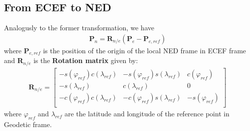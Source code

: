 \subsection*{From ECEF to NED}
Analogusly to the former transformation, we have
\begin{align}
\textbf{P}_{n} = \textbf{R}_{n/e}\left(\textbf{P}_{e} - \textbf{P}_{e,ref}\right)
\end{align}
where \textbf{P}$_{e,ref}$ is the position of the origin of the local NED frame in ECEF frame and \textbf{R}$_{n/e}$ is the \textbf{Rotation matrix} given by: 
\begin{align*}
\textbf{R}_{n/e} =
\begin{bmatrix}
-s(\varphi_{ref})c(\lambda_{ref}) & -s(\varphi_{ref})s(\lambda_{ref}) & c(\varphi_{ref})\\
-s(\lambda_{ref}) & c(\lambda_{ref}) & 0\\
-c(\varphi_{ref})c(\lambda_{ref}) & -c(\varphi_{ref})s(\lambda_{ref}) & -s(\varphi_{ref})\\
\end{bmatrix}
\end{align*}
where $\varphi_{ref}$ and $\lambda_{ref}$ are the latitude and longitude of the reference point in Geodetic frame.